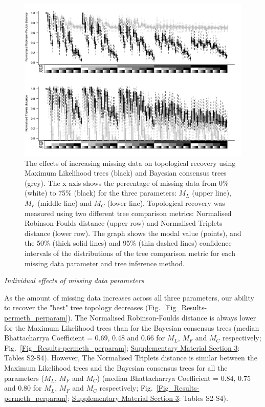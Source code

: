 \documentclass[12pt,letterpaper]{article}
\renewcommand{\subsection}[1]{%
\bigskip
\begin{center}
\begin{large}
\normalfont\itshape #1
\end{large}
\end{center}}
\begin{document}
\begin{figure} 
\centering
    \includegraphics[width=1\textwidth]{Figures/In_main/ML+Baycon-AllParam-RF+Tr-BW.pdf}
\caption{The effects of increasing missing data on topological recovery using Maximum Likelihood trees (black) and Bayesian consensus trees (grey). The x axis shows the percentage of missing data from 0\% (white) to 75\% (black) for the three parameters: $M_{L}$ (upper line), $M_{F}$ (middle line) and $M_{C}$ (lower line). Topological recovery was measured using two different tree comparison metrics: Normalised Robinson-Foulds distance (upper row) and Normalised Triplets distance (lower row). The graph shows the modal value (points), and the 50\% (thick solid lines) and 95\% (thin dashed lines) confidence intervals of the distributions of the tree comparison metric for each missing data parameter and tree inference method.} 
\label{Fig_Results-global_perparam} %
\end{figure}

\subsection{Individual effects of missing data parameters}
As the amount of missing data increases across all three parameters, our ability to recover the "best" tree topology decreases (Fig.~\ref{Fig_Results-permeth_perparam}).
The Normalised Robinson-Foulds distance is always lower for the Maximum Likelihood trees than for the Bayesian consensus trees (median Bhattacharrya Coefficient = 0.69, 0.48 and 0.66 for $M_{L}$, $M_{F}$ and $M_{C}$ respectively; Fig.~\ref{Fig_Results-permeth_perparam}; \hyperref[SupplementaryMaterial]{Supplementary Material Section 3}: Tables S2-S4).
However, The Normalised Triplets distance is similar between the Maximum Likelihood trees and the Bayesian consensus trees for all the parameters ($M_{L}$, $M_{F}$ and $M_{C}$) (median Bhattacharrya Coefficient = 0.84, 0.75 and 0.80 for $M_{L}$, $M_{F}$ and $M_{C}$ respectively; Fig.~\ref{Fig_Results-permeth_perparam}; \hyperref[SupplementaryMaterial]{Supplementary Material Section 3}: Tables S2-S4).
\end{document}
